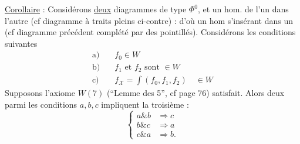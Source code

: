 \uline{Corollaire} : Considérons \uline{deux} diagrammes de type $\Phi^0$, et un hom.  de l'un dans l'autre (cf diagramme à traits pleins ci-contre) :
d'où un hom
s'insérant dans un   (cf diagramme précédent complété par des pointillés). Considérons les conditions suivantes
\[
\begin{aligned}
\text{a)}\quad & f_0\in W\\
\text{b)}\quad & f_1\text{ et }f_2\text{ sont }\in W\\
\text{c)}\quad & f_{\mathscr X}=\int(f_0,f_1,f_2)\quad\in W
\end{aligned}
\]
Supposons l'axiome $W(7)$ (\textquotedblleft Lemme des 5\textquotedblright, cf page 76) satisfait. Alors deux  parmi les conditions $a,b,c$ impliquent la troisième :
\[
\left\{\begin{aligned}
a\mathbin{\&} b&\Longrightarrow c\\
b\mathbin{\&} c&\Longrightarrow a\\
c\mathbin{\&} a&\Longrightarrow b .
\end{aligned}\right.
\]

